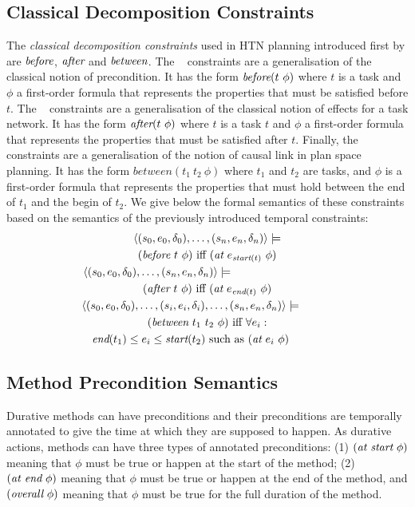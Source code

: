 \documentclass[letterpaper]{article} %
\newcommand{\at}{\text{\it at}}
\newcommand{\before}{\text{\it before}}
\newcommand{\after}{\text{\it after}}
\renewcommand{\between}{\text{\it between}}
\newcommand{\atstart}{\text{\it at start}}
\newcommand{\atend}{\text{\it at end}}
\newcommand{\overall}{\text{\it overall}}
\newcommand{\tstart}{\text{\it start}}
\newcommand{\tend}{\text{\it end}}
\begin{document}
\subsection{Classical Decomposition Constraints}

The \emph{classical decomposition constraints} used in HTN planning introduced first by \citep{erol94} are $\before$, $\after$ and $\between$. The \before~ constraints are a generalisation of the classical notion of precondition. It has the form $\before(t\ \phi)$ where $t$ is a task and $\phi$ a first-order formula that represents the properties that must be satisfied before $t$. The \after~ constraints are a generalisation of the classical notion of effects for a task network. It has the form $\after(t\ \phi)$ where $t$ is a task $t$ and $\phi$ a first-order formula that represents the properties that must be satisfied after $t$. Finally, the \between~ constraints are a generalisation of the notion of causal link in plan space planning. It has the form $between(t_1\ t_2\ \phi)$ where $t_1$ and $t_2$ are tasks, and $\phi$ is a first-order formula that represents the properties that must hold between the end of $t_1$ and the begin of $t_2$. We give below the formal semantics of these constraints based on the semantics of the previously introduced temporal constraints:
\begin{multline*}
\langle (s_0, e_0, \delta_0), \ldots, (s_n, e_n, \delta_n) \rangle \models  \\
(\before \ t \ \phi) \  \text{iff} \ (\at \ e_{\tstart(t)} \ \phi) \\
\langle (s_0, e_0, \delta_0), \ldots, (s_n, e_n, \delta_n) \rangle \models  \qquad \qquad \qquad \qquad \quad\\
(\after \ t \ \phi) \  \text{iff} \ (\at \ e_{\tend(t)} \ \phi) \\
\langle (s_0, e_0, \delta_0), \ldots, (s_i, e_i, \delta_i), \ldots, (s_n, e_n, \delta_n) \rangle \models \qquad \quad \\
    (\between \ t_1 \ t_2 \ \phi) \ \text{iff} \ \forall e_i :  \\
\tend(t_1) \leq e_i \leq \tstart(t_2) \ \text{such as} \ (\at \ e_i \ \phi) \qquad \quad
\end{multline*}

\subsection{Method Precondition Semantics}

Durative methods can have preconditions and their preconditions are temporally annotated to give the time at which they are supposed to happen. As durative actions, methods can have three types of annotated preconditions: (1) $(\atstart \ \phi)$ meaning that $\phi$ must be true or happen at the start of the method; (2) $(\atend \ \phi)$ meaning that $\phi$ must be true or happen at the end of the method, and $(\overall \ \phi)$ meaning that $\phi$ must be true for the full duration of the method.
\end{document}
